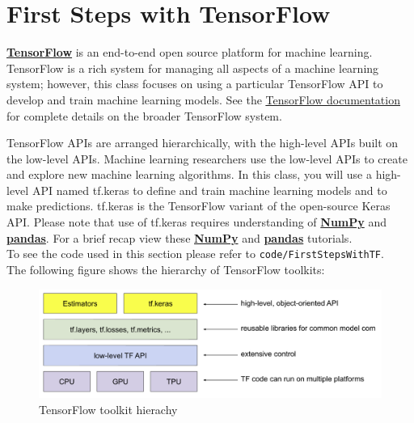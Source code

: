 \documentclass[12pt]{article}
\begin{document}
\section{First Steps with TensorFlow}
\href{https://developers.google.com/machine-learning/glossary#TensorFlow}{\textbf{TensorFlow}} is an end-to-end open source platform for machine learning. TensorFlow is a rich system for managing all aspects of a machine learning system; however, this class focuses on using a particular TensorFlow API to develop and train machine learning models. See the \href{https://tensorflow.org/}{\underline{TensorFlow documentation}} for complete details on the broader TensorFlow system.

TensorFlow APIs are arranged hierarchically, with the high-level APIs built on the low-level APIs. Machine learning researchers use the low-level APIs to create and explore new machine learning algorithms. In this class, you will use a high-level API named tf.keras to define and train machine learning models and to make predictions. tf.keras is the TensorFlow variant of the open-source Keras API. Please note that use of tf.keras requires understanding of \href{https://numpy.org/}{\textbf{NumPy}} and \href{https://pandas.pydata.org/}{\textbf{pandas}}. For a brief recap view these \href{https://colab.research.google.com/github/google/eng-edu/blob/main/ml/cc/exercises/numpy_ultraquick_tutorial.ipynb?utm_source=mlcc&utm_campaign=colab-external&utm_medium=referral&utm_content=numpy_tf2-colab&hl=en}{\textbf{NumPy}} and \href{https://colab.research.google.com/github/google/eng-edu/blob/main/ml/cc/exercises/pandas_dataframe_ultraquick_tutorial.ipynb?utm_source=mlcc&utm_campaign=colab-external&utm_medium=referral&utm_content=pandas_tf2-colab&hl=en}{\textbf{pandas}} tutorials.
\\To see the code used in this section please refer to {\tt{code/FirstStepsWithTF}}.
\\The following figure shows the hierarchy of TensorFlow toolkits:

\begin{figure}[h]
	\centering
	\includegraphics[scale = 0.55]{imgs/TFHierarchy.png}
	\caption{TensorFlow toolkit hierachy}
\end{figure}
\end{document}
